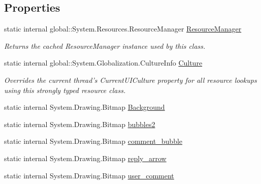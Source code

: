 \subsection*{\-Properties}
\begin{DoxyCompactItemize}
\item 
static internal \*
global\-::\-System.\-Resources.\-Resource\-Manager \hyperlink{class_sr_p___classroom_inq_1_1_properties_1_1_resources_a7809b92866e9561f253e4829dc02560f}{\-Resource\-Manager}
\begin{DoxyCompactList}\small\item\em \-Returns the cached \-Resource\-Manager instance used by this class. \end{DoxyCompactList}\item 
static internal \*
global\-::\-System.\-Globalization.\-Culture\-Info \hyperlink{class_sr_p___classroom_inq_1_1_properties_1_1_resources_a1788010aa2d65a3c3244ec2f6ccd20ed}{\-Culture}
\begin{DoxyCompactList}\small\item\em \-Overrides the current thread's \-Current\-U\-I\-Culture property for all resource lookups using this strongly typed resource class. \end{DoxyCompactList}\item 
static internal \*
\-System.\-Drawing.\-Bitmap \hyperlink{class_sr_p___classroom_inq_1_1_properties_1_1_resources_a16ac92929f55281abad59488efae062b}{\-Background}
\item 
static internal \*
\-System.\-Drawing.\-Bitmap \hyperlink{class_sr_p___classroom_inq_1_1_properties_1_1_resources_ae15d966afaa44ab7f083fa1bb1cf1c82}{bubbles2}
\item 
static internal \*
\-System.\-Drawing.\-Bitmap \hyperlink{class_sr_p___classroom_inq_1_1_properties_1_1_resources_a2ca7de7a89e9cc488bc2e7ca92f49c94}{comment\-\_\-bubble}
\item 
static internal \*
\-System.\-Drawing.\-Bitmap \hyperlink{class_sr_p___classroom_inq_1_1_properties_1_1_resources_ab0a3e726876b922e1691be1f3853b481}{reply\-\_\-arrow}
\item 
static internal \*
\-System.\-Drawing.\-Bitmap \hyperlink{class_sr_p___classroom_inq_1_1_properties_1_1_resources_a640888878348ec44e2974837abb13f97}{user\-\_\-comment}
\end{DoxyCompactItemize}

